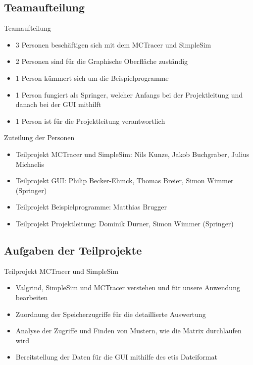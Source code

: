 \subsection{Teamaufteilung}
\begin{frame}
\begin{block}{Teamaufteilung}
\begin{itemize}[<+->]
\pause\item 3 Personen beschäftigen sich mit dem MCTracer und SimpleSim
\item 2 Personen sind für die Graphische Oberfläche zuständig
\item 1 Person kümmert sich um die Beispielprogramme
\item 1 Person fungiert als Springer, welcher Anfangs bei der Projektleitung und danach bei der GUI mithilft
\item 1 Person ist für die Projektleitung verantwortlich
\end{itemize}
\end{block}
\end{frame}

\begin{frame}
\begin{block}{Zuteilung der Personen}
\begin{itemize}[<+->]
\pause\item Teilprojekt MCTracer und SimpleSim: Nils Kunze, Jakob Buchgraber, Julius Michaelis
\item Teilprojekt GUI: Philip Becker-Ehmck, Thomas Breier, Simon Wimmer (Springer)
\item Teilprojekt Beispielprogramme: Matthias Brugger
\item Teilprojekt Projektleitung: Dominik Durner, Simon Wimmer (Springer)
\end{itemize}
\end{block}
\end{frame}

\subsection{Aufgaben der Teilprojekte}

\begin{frame}
\begin{block}{Teilprojekt MCTracer und SimpleSim}
\begin{itemize}[<+->]
\pause\item Valgrind, SimpleSim und MCTracer verstehen und für unsere Anwendung bearbeiten
\item Zuordnung der Speicherzugriffe für die detaillierte Auswertung
\item Analyse der Zugriffe und Finden von Mustern, wie die Matrix durchlaufen wird
\item Bereitstellung der Daten für die GUI mithilfe des etis Dateiformat
\end{itemize}
\end{block}
\end{frame}

